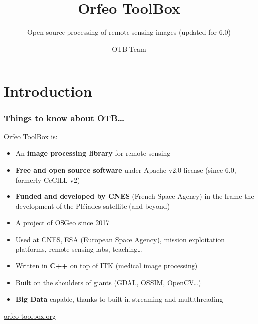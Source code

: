 \documentclass[8pt]{beamer}
\title{Orfeo ToolBox}
\subtitle{Open source processing of remote sensing images (updated for 6.0)}
\author{OTB Team}
\date{}
\begin{document}
\begin{frame}
\titlepage
\end{frame}

\section*{Introduction}

\begin{frame}
\frametitle{Things to know about OTB\ldots}
\begin{block}{Orfeo ToolBox is:}
\begin{itemize}
\item An \textbf{image processing library} for remote sensing
\item \textbf{Free and open source software} under Apache v2.0 license (since 6.0, formerly CeCILL-v2)
\item \textbf{Funded and developed by CNES} (French Space Agency) in the frame
  the development of the Pléiades satellite (and beyond)
\item A project of OSGeo since 2017
\item Used at CNES, ESA (European Space Agency), mission exploitation platforms,
  remote sensing labs, teaching\ldots
\item Written in \textbf{C++} on top of \href{www.itk.org}{ITK} (medical image
  processing)
\item Built on the shoulders of giants (GDAL, OSSIM, OpenCV\ldots)
\item \textbf{Big Data} capable, thanks to built-in streaming and multithreading
\end{itemize}
\end{block}

\begin{center}
{\huge\textcolor{red}{\href{http://www.orfeo-toolbox.org}{orfeo-toolbox.org}}}
\end{center}

\end{frame}
\end{document}
